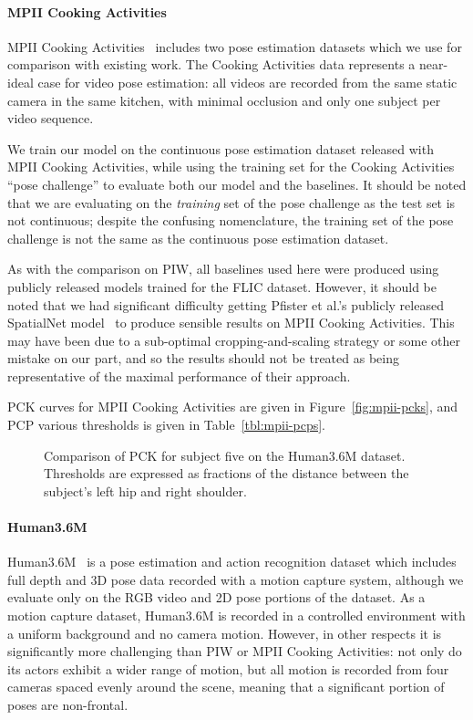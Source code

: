 \documentclass[runningheads]{llncs}
\begin{document}
\paragraph{MPII Cooking Activities} MPII Cooking
Activities~\cite{rohrbach2012database} includes two pose estimation datasets
which we use for comparison with existing work. The Cooking Activities data
represents a near-ideal case for video pose estimation: all videos are recorded
from the same static camera in the same kitchen, with minimal occlusion and
only one subject per video sequence.

We train our model on the continuous pose estimation dataset released with MPII
Cooking Activities, while using the training set for the Cooking Activities
``pose challenge'' to evaluate both our model and the baselines. It should be
noted that we are evaluating on the \textit{training} set of the pose challenge
as the test set is not continuous; despite the confusing nomenclature, the
training set of the pose challenge is not the same as the continuous pose
estimation dataset.

As with the comparison on PIW, all baselines used here were produced using
publicly released models trained for the FLIC dataset. However, it should be
noted that we had significant difficulty getting Pfister et al.'s publicly
released SpatialNet model~\cite{pfister2015flowing} to produce sensible results
on MPII Cooking Activities. This may have been due to a sub-optimal
cropping-and-scaling strategy or some other mistake on our part, and so the
results should not be treated as being representative of the maximal performance
of their approach.

PCK curves for MPII Cooking Activities are given in Figure~\ref{fig:mpii-pcks},
and PCP various thresholds is given in Table~\ref{tbl:mpii-pcps}.

\begin{figure}[t]
\begin{center}

\end{center}
\vspace{-5mm}
\caption{Comparison of PCK for subject five on the Human3.6M dataset. Thresholds
are expressed as fractions of the distance between the subject's left hip and
right shoulder.}
\label{fig:h36m-pck}
\end{figure}

\paragraph{Human3.6M} Human3.6M~\cite{ionescu2014human,ionescu2011latent} is a
pose estimation and action recognition dataset which includes full depth and 3D
pose data recorded with a motion capture system, although we evaluate only on
the RGB video and 2D pose portions of the dataset. As a motion capture dataset,
Human3.6M is recorded in a controlled environment with a uniform background and
no camera motion. However, in other respects it is significantly more
challenging than PIW or MPII Cooking Activities: not only do its actors exhibit
a wider range of motion, but all motion is recorded from four cameras spaced
evenly around the scene, meaning that a significant portion of poses are
non-frontal.
\end{document}

